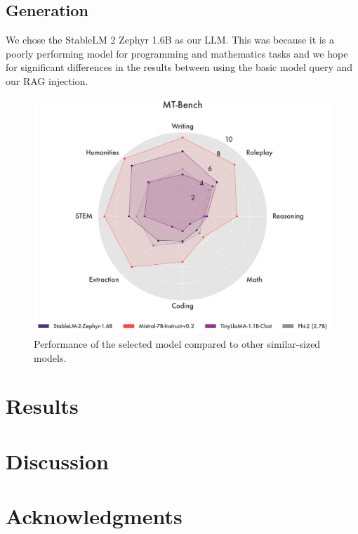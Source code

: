 \documentclass[fleqn,moreauthors,10pt]{ds_report}
\begin{document}
\subsection*{Generation}
We chose the StableLM 2 Zephyr 1.6B \cite{stabilityAI} as our LLM. This was because it is a poorly performing model for programming and mathematics tasks and we hope for significant differences in the results between using the basic model query and our RAG injection. 
\begin{figure}[h]
    \centering
    \includegraphics[width=0.8\linewidth]{fig/QH00HVM3lg-5f17U_py4K.png}
    \caption{Performance of the selected model compared to other similar-sized models.}
    \label{fig:example} %
\end{figure}

\section*{Results}


\section*{Discussion}


\section*{Acknowledgments}



\end{document}
